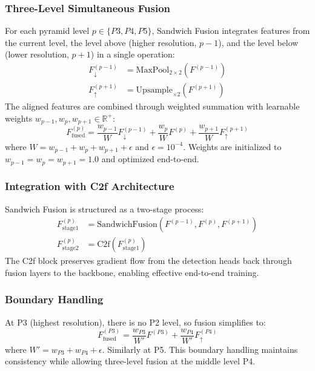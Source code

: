 \documentclass[preprint,12pt]{elsarticle}
\begin{document}
\subsubsection{Three-Level Simultaneous Fusion}

For each pyramid level $p \in \{P3, P4, P5\}$, Sandwich Fusion integrates
features from the current level, the level above (higher resolution, $p-1$), and
the level below (lower resolution, $p+1$) in a single operation:
\begin{align}
F^{(p-1)}_{\downarrow} &= \text{MaxPool}_{2\times2}(F^{(p-1)}) \\
F^{(p+1)}_{\uparrow} &= \text{Upsample}_{\times2}(F^{(p+1)})
\end{align}
The aligned features are combined through weighted summation with learnable weights
$w_{p-1}, w_p, w_{p+1} \in \mathbb{R}^+$:
\begin{equation}
F_{\text{fused}}^{(p)} = \frac{w_{p-1}}{W} F^{(p-1)}_{\downarrow} +
\frac{w_p}{W} F^{(p)} + \frac{w_{p+1}}{W} F^{(p+1)}_{\uparrow}
\end{equation}
where $W = w_{p-1} + w_p + w_{p+1} + \epsilon$ and $\epsilon = 10^{-4}$.
Weights are initialized to $w_{p-1} = w_p = w_{p+1} = 1.0$ and optimized
end-to-end.

\subsubsection{Integration with C2f Architecture}

Sandwich Fusion is structured as a two-stage process:
\begin{align}
F_{\text{stage1}}^{(p)} &= \text{SandwichFusion}(F^{(p-1)}, F^{(p)}, F^{(p+1)}) \\
F_{\text{stage2}}^{(p)} &= \text{C2f}(F_{\text{stage1}}^{(p)})
\end{align}
The C2f block preserves gradient flow from the detection heads back through fusion
layers to the backbone, enabling effective end-to-end training.

\subsubsection{Boundary Handling}

At P3 (highest resolution), there is no P2 level, so fusion simplifies to:
\begin{equation}
F_{\text{fused}}^{(P3)} = \frac{w_{P3}}{W'} F^{(P3)} + \frac{w_{P4}}{W'} F^{(P4)}_{\uparrow}
\end{equation}
where $W' = w_{P3} + w_{P4} + \epsilon$. Similarly at P5. This boundary handling
maintains consistency while allowing three-level fusion at the middle level P4.
\end{document}
